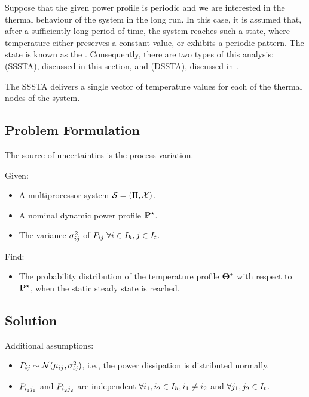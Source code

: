 Suppose that the given power profile is periodic and we are interested in the thermal behaviour of the system in the long run. In this case, it is assumed that, after a sufficiently long period of time, the system reaches such a state, where temperature either preserves a constant value, or exhibits a periodic pattern. The state is known as the . Consequently, there are two types of this analysis:  (SSSTA), discussed in this section, and  (DSSTA), discussed in .

The SSSTA delivers a single vector of temperature values for each of the thermal nodes of the system.

\subsection{Problem Formulation}
The source of uncertainties is the process variation.

Given:
\begin{itemize}
  \item A multiprocessor system $\mathcal{S} = (\Pi, \mathcal{X})$.
  \item A nominal dynamic power profile $\mathbf{P}^\star$.
  \item The variance $\sigma_{ij}^2$ of $P_{ij} \; \forall i \in I_h, j \in I_t$.
\end{itemize}

Find:
\begin{itemize}
  \item The probability distribution of the temperature profile $\mathbf{\Theta}^\star$ with respect to $\mathbf{P}^\star$, when the static steady state is reached.
\end{itemize}

\subsection{Solution} 
Additional assumptions:
\begin{itemize}
  \item $P_{ij} \sim \mathcal{N}(\mu_{ij}, \sigma_{ij}^2)$, i.e., the power dissipation is distributed normally.
  \item $P_{i_1 j_1}$ and $P_{i_2 j_2}$ are independent $\forall i_1, i_2 \in I_h,  i_1 \neq i_2$ and $\forall j_1, j_2 \in I_t$.
\end{itemize}

